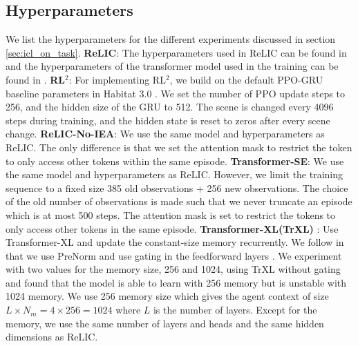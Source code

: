 \documentclass{article}
\newcommand{\method}{ReLIC\xspace}
\newcommand{\rls}{RL$^{2}$\xspace}
\newcommand{\semethod}{Transformer-SE\xspace}
\newcommand{\ieafmethod}{\method-No-IEA\xspace}
\newcommand{\trxl}{Transformer-XL\xspace}
\begin{document}
\subsection{Hyperparameters}
\label{sec:hyperparams}
We list the hyperparameters for the different experiments discussed in section \cref{sec:icl_on_task}.
\textbf{{\method}}: The hyperparameters used in \method can be found in  and the hyperparameters of the transformer model used in the training can be found in .
\textbf{\rls}: For implementing \rls, we build on the default PPO-GRU baseline parameters in Habitat 3.0 \cite{puig2023habitat3}. We set the number of PPO update steps to 256, and the hidden size of the GRU to 512. The scene is changed every 4096 steps during training, and the hidden state is reset to zeros after every scene change.
\textbf{\ieafmethod}: We use the same model and hyperparameters as \method. The only difference is that we set the attention mask to restrict the token to only access other tokens within the same episode.
\textbf{\semethod}: We use the same model and hyperparameters as \method. However, we limit the training sequence to a fixed size 385 old observations + 256 new observations. The choice of the old number of observations is made such that we never truncate an episode which is at most 500 steps. The attention mask is set to restrict the tokens to only access other tokens in the same episode.
\textbf{\trxl (TrXL)} \cite{dai2019transformerxl}: Use Transformer-XL and update the constant-size memory recurrently. We follow \cite{team2023human} in that we use PreNorm \cite{gtrxl} and use gating in the feedforward layers \cite{shazeer2020glu}. We experiment with two values for the memory size, 256 and 1024, using TrXL without gating and found that the model is able to learn with 256 memory but is unstable with 1024 memory. We use 256 memory size which gives the agent context of size $L \times N_m=4\times 256=1024$ where $L$ is the number of layers. Except for the memory, we use the same number of layers and heads and the same hidden dimensions as \method.
\end{document}
